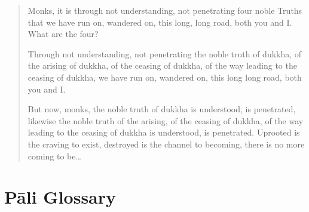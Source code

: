 \documentclass{book}
\begin{document}
\begin{quote}
Monks, it is through not understanding, not penetrating four noble
Truths that we have run on, wandered on, this long, long road, both you
and I. What are the four?

Through not understanding, not penetrating the noble truth of dukkha, of
the arising of dukkha, of the ceasing of dukkha, of the way leading to
the ceasing of dukkha, we have run on, wandered on, this long long road,
both you and I.

But now, monks, the noble truth of dukkha is understood, is penetrated,
likewise the noble truth of the arising, of the ceasing of dukkha, of
the way leading to the ceasing of dukkha is understood, is penetrated.
Uprooted is the craving to exist, destroyed is the channel to becoming,
there is no more coming to be\ldots{}
\end{quote}

\chapter{Pāli Glossary}
\end{document}
